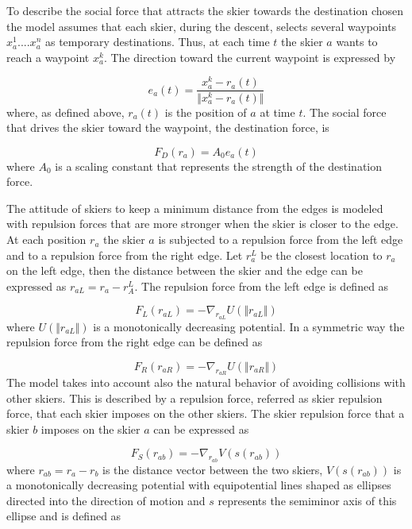 \documentclass[12pt,a4paper,twoside]{book}
\begin{document}
To describe the social force that attracts the skier towards the destination chosen the model assumes that each skier, during the descent, selects several waypoints $x_a^1....x_a^n$ as temporary destinations. Thus, at each time $t$ the skier $a$ wants to reach a waypoint $x_a^k$. The direction toward the current waypoint is expressed by

\begin{equation}\label{waypoint_direction}
e_a(t)=\frac{x^k_a-r_a(t)}{\Vert x^k_a-r_a(t) \Vert}
\end{equation}
where, as defined above, $r_a(t)$ is the position of $a$ at time $t$. The social force that drives the skier toward the waypoint, the destination force, is

\begin{equation}\label{destination_force}
F_D(r_a)=A_0 e_a(t)
\end{equation}
where $A_0$ is a scaling constant that represents the strength of the destination force.

The attitude of skiers to keep a minimum distance from the edges is modeled with repulsion forces that are more stronger when the skier is closer to the edge. At each position $r_a$ the skier $a$ is subjected to a repulsion force from the left edge and to a repulsion force from the right edge. Let $r_a^L$ be the closest location to $r_a$ on the left edge, then the distance between the skier and the edge can be expressed as $r_{aL}=r_a-r_A^L$. The repulsion force from the left edge is defined as

\begin{equation}\label{left_force}
F_L(r_{aL})=-\nabla_{r_{aL}}U(\Vert r_{aL} \Vert )
\end{equation}
where $U(\Vert r_{aL} \Vert )$ is a monotonically decreasing potential. In a symmetric way the repulsion force from the right edge can be defined as

\begin{equation}\label{right_force}
F_R(r_{aR})=-\nabla_{r_{aR}}U(\Vert r_{aR} \Vert )
\end{equation}
The model takes into account also the natural behavior of avoiding collisions with other skiers. This is described by a repulsion force, referred as skier repulsion force, that each skier imposes on the other skiers. The skier repulsion force that a skier $b$ imposes on the skier $a$ can be expressed as

\begin{equation}\label{skier_force}
F_S(r_{ab})=-\nabla_{r_{ab}}V(s(r_{ab}))
\end{equation}
where $r_{ab}=r_a-r_b$ is the distance vector between the two skiers, $V(s(r_{ab}))$ is a monotonically decreasing potential with equipotential lines shaped as ellipses directed into the direction of motion and $s$ represents the semiminor axis of this ellipse and is defined as
\end{document}
